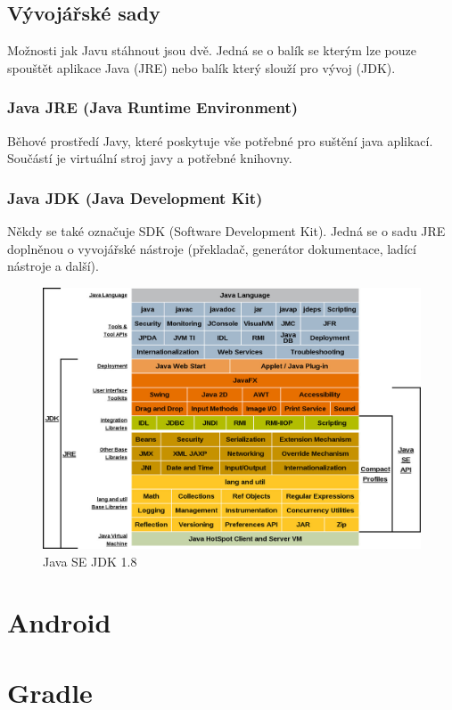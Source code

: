\subsection{Vývojářské sady}
Možnosti jak Javu stáhnout jsou dvě. Jedná se o balík se kterým lze pouze spouštět aplikace Java (JRE) nebo balík který slouží pro vývoj (JDK).

\subsubsection{Java JRE (Java Runtime Environment)}
Běhové prostředí Javy, které poskytuje vše potřebné pro suštění java aplikací. Součástí je virtuální stroj javy a potřebné knihovny.

\subsubsection{Java JDK (Java Development Kit)}
Někdy se také označuje SDK (Software Development Kit). Jedná se o sadu JRE doplněnou o vyvojářské nástroje (překladač, generátor dokumentace, ladící nástroje a další).

\begin{figure}[h!]
    \centering
    \includegraphics[scale=0.3]{fig/java_jdk.jpg}
    \caption{Java SE JDK 1.8}
\end{figure}



\section{Android}



\section{Gradle}


